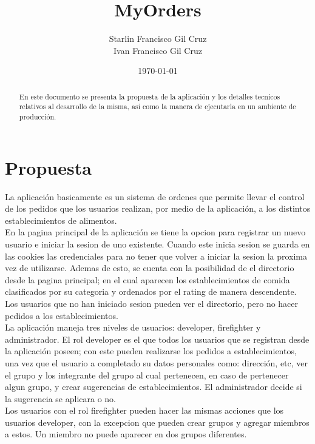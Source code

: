 \documentclass[12pt]{article}
\begin{document}
\title{MyOrders}
\date{\today}
\author{Starlin Francisco Gil Cruz\\
Ivan Francisco Gil Cruz}
\maketitle

\begin{abstract}
En este documento se presenta la propuesta de la aplicación y los detalles tecnicos relativos al desarrollo de la misma, asi como 
la manera de ejecutarla en un ambiente de producción.
\end{abstract}

\section{Propuesta}
La aplicación basicamente es un sistema de ordenes que permite llevar el control de los pedidos que los usuarios realizan, por medio de la aplicación, a los distintos establecimientos de alimentos.\\

En la pagina principal de la aplicación se tiene la opcion para registrar un nuevo usuario e iniciar la sesion de uno existente. Cuando este inicia sesion se guarda en las cookies las credenciales para no tener que volver a iniciar la sesion la proxima vez de utilizarse. Ademas de esto, se cuenta con la posibilidad de el directorio desde la pagina principal; en el cual aparecen los establecimientos de comida clasificados por su categoria y ordenados por el rating de manera descendente. Los usuarios que no han iniciado sesion pueden ver el directorio, pero no hacer pedidos a los establecimientos.\\ 

La aplicación maneja tres niveles de usuarios: developer, firefighter y administrador. El rol developer es el que todos los usuarios que se registran desde la aplicación poseen; con este pueden realizarse los pedidos a establecimientos, una vez que el usuario a completado su datos personales como: dirección, etc, ver el grupo y los integrante del grupo al cual pertenecen, en caso de pertenecer algun grupo, y crear sugerencias de establecimientos. El administrador decide si la sugerencia se aplicara o no.\\

Los usuarios con el rol firefighter pueden hacer las mismas acciones que los usuarios developer, con la excepcion que pueden crear grupos y agregar miembros a estos. Un miembro no puede aparecer en dos grupos diferentes.
\end{document}

